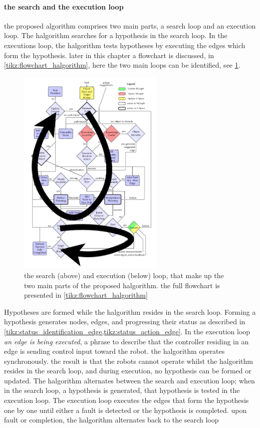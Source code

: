 \paragraph{the search and the execution loop}
the proposed algorithm comprises two main parts, a search loop and an execution loop. The \ac{halgorithm} searches for a hypothesis in the search loop. In the executions loop, the \ac{halgorithm} tests hypotheses by executing the edges which form the hypothesis. later in this chapter a flowchart is discussed, in \cref{tikz:flowchart_halgorithm}, here the two main loops can be identified, see \cref{fig:two_loops_identified}.\bs
\begin{figure}[h]
    \centering
    \includegraphics[width=7cm]{figures/proposed_method/two_loops_identified}
    \caption{the search (above) and execution (below) loop, that make up the two main parts of the proposed \ac{halgorithm}. the full flowchart is presented in \cref{tikz:flowchart_halgorithm}}%
    \label{fig:two_loops_identified}
\end{figure}

Hypotheses are formed while the \ac{halgorithm} resides in the search loop. Forming a hypothesis generates nodes, edges, and progressing their status as described in \cref{tikz:status_identification_edge,tikz:status_action_edge}. In the execution loop \textit{an edge is being executed}, a phrase to describe that the controller residing in an edge is sending control input toward the robot. the \ac{halgorithm} operates synchronously. the result is that the robots cannot operate whilst the \ac{halgorithm} resides in the search loop, and during execution, no hypothesis can be formed or updated. The \ac{halgorithm} alternates between the search and execution loop; when in the search loop, a hypothesis is generated, that hypothesis is tested in the execution loop. The execution loop executes the edges that form the hypothesis one by one until either a fault is detected or the hypothesis is completed. upon fault or completion, the \ac{halgorithm} alternates back to the search loop\bs

